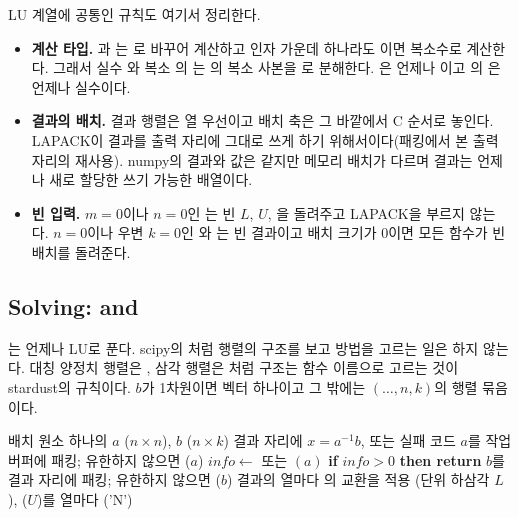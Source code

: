 LU 계열에 공통인 규칙도 여기서 정리한다.
\begin{itemize}
\item \textbf{계산 타입.} 과 는 로 바꾸어 계산하고 인자 가운데 하나라도 이면 복소수로 계산한다. 그래서 실수 와 복소 의 는 의 복소 사본을 로 분해한다. 은 언제나 이고 의 은 언제나 실수이다.
\item \textbf{결과의 배치.} 결과 행렬은 열 우선이고 배치 축은 그 바깥에서 C 순서로 놓인다. LAPACK이 결과를 출력 자리에 그대로 쓰게 하기 위해서이다(패킹에서 본 출력 자리의 재사용). numpy의 결과와 값은 같지만 메모리 배치가 다르며 결과는 언제나 새로 할당한 쓰기 가능한 배열이다.
\item \textbf{빈 입력.} $m=0$이나 $n=0$인 는 빈 $L$, $U$, 을 돌려주고 LAPACK을 부르지 않는다. $n=0$이나 우변 $k=0$인 와 는 빈 결과이고 배치 크기가 $0$이면 모든 함수가 빈 배치를 돌려준다.
\end{itemize}

\subsection{Solving: \texorpdfstring{}{solve} and \texorpdfstring{}{lu\_solve}}

는 언제나 LU로 푼다. scipy의 처럼 행렬의 구조를 보고 방법을 고르는 일은 하지 않는다. 대칭 양정치 행렬은 , 삼각 행렬은 처럼 구조는 함수 이름으로 고르는 것이 stardust의 규칙이다. $b$가 1차원이면 벡터 하나이고 그 밖에는 $(\dots,n,k)$의 행렬 묶음이다.

\begin{algorithm}[htbp]
\begin{algorithmic}[1]
\Require 배치 원소 하나의 $a$ ($n\times n$), $b$ ($n\times k$)
\Ensure 결과 자리에 $x=a^{-1}b$, 또는 실패 코드
\State $a$를 작업 버퍼에 패킹; 유한하지 않으면 \Return {}($a$)
\State $\mathit{info}\gets$  또는 $(a)$ 
\State \textbf{if} $\mathit{info}>0$ \textbf{then return} 
\State $b$를 결과 자리에 패킹; 유한하지 않으면 \Return {}($b$)
  \State 결과의 열마다 의 교환을 적용
  \State {}(단위 하삼각 $L$), ($U$)를 열마다
\Else
  \State {}('N') 
\EndIf
\end{algorithmic}
\caption{의 배치 원소 하나}
\label{alg:lu-solve-body}
\end{algorithm}

